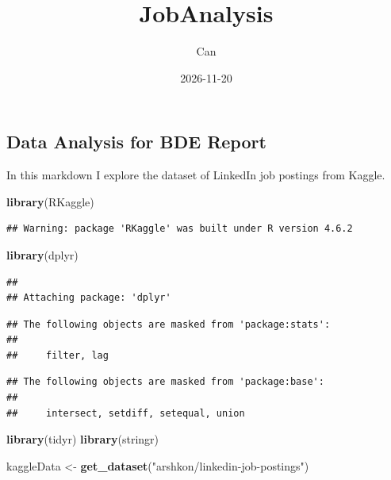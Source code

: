 \documentclass[
]{article}
\title{JobAnalysis}
\author{Can}
\date{2026-11-20}
\newenvironment{Shaded}{\begin{snugshade}}{\end{snugshade}}
\newcommand{\FunctionTok}[1]{\textcolor[rgb]{0.13,0.29,0.53}{\textbf{#1}}}
\newcommand{\NormalTok}[1]{#1}
\newcommand{\OtherTok}[1]{\textcolor[rgb]{0.56,0.35,0.01}{#1}}
\newcommand{\StringTok}[1]{\textcolor[rgb]{0.31,0.60,0.02}{#1}}
\begin{document}
\maketitle

\subsection{Data Analysis for BDE
Report}\label{data-analysis-for-bde-report}

In this markdown I explore the dataset of LinkedIn job postings from
Kaggle.

\begin{Shaded}
\begin{Highlighting}[]
\FunctionTok{library}\NormalTok{(RKaggle)}
\end{Highlighting}
\end{Shaded}

\begin{verbatim}
## Warning: package 'RKaggle' was built under R version 4.6.2
\end{verbatim}

\begin{Shaded}
\begin{Highlighting}[]
\FunctionTok{library}\NormalTok{(dplyr)}
\end{Highlighting}
\end{Shaded}

\begin{verbatim}
## 
## Attaching package: 'dplyr'
\end{verbatim}

\begin{verbatim}
## The following objects are masked from 'package:stats':
## 
##     filter, lag
\end{verbatim}

\begin{verbatim}
## The following objects are masked from 'package:base':
## 
##     intersect, setdiff, setequal, union
\end{verbatim}

\begin{Shaded}
\begin{Highlighting}[]
\FunctionTok{library}\NormalTok{(tidyr)}
\FunctionTok{library}\NormalTok{(stringr)}

\NormalTok{kaggleData }\OtherTok{\textless{}{-}} \FunctionTok{get\_dataset}\NormalTok{(}\StringTok{"arshkon/linkedin{-}job{-}postings"}\NormalTok{)}
\end{Highlighting}
\end{Shaded}
\end{document}
